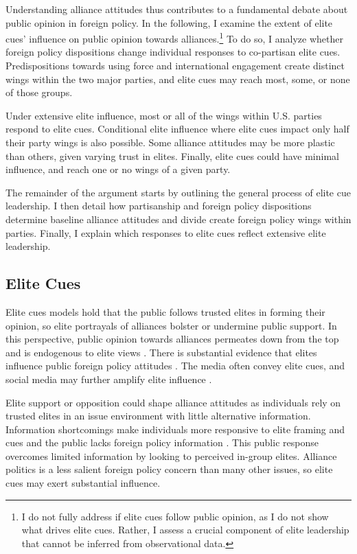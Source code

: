 \documentclass[12pt]{article}
\begin{document}
Understanding alliance attitudes thus contributes to a fundamental debate about public opinion in foreign policy. 
In the following, I examine the extent of elite cues' influence on public opinion towards alliances.\footnote{I do not fully address if elite cues follow public opinion, as I do not show what drives elite cues. Rather, I assess a crucial component of elite leadership that cannot be inferred from observational data.}
To do so, I analyze whether foreign policy dispositions change individual responses to co-partisan elite cues.
Predispositions towards using force and international engagement create distinct wings within the two major parties, and elite cues may reach most, some, or none of those groups.


Under extensive elite influence, most or all of the wings within U.S. parties respond to elite cues. 
Conditional elite influence where elite cues impact only half their party wings is also possible. 
Some alliance attitudes may be more plastic than others, given varying trust in elites. 
Finally, elite cues could have minimal influence, and reach one or no wings of a given party.


The remainder of the argument starts by outlining the general process of elite cue leadership.
I then detail how partisanship and foreign policy dispositions determine baseline alliance attitudes and divide create foreign policy wings within parties.
Finally, I explain which responses to elite cues reflect extensive elite leadership. 


\subsection{Elite Cues} 


Elite cues models hold that the public follows trusted elites in forming their opinion, so elite portrayals of alliances bolster or undermine public support.
In this perspective, public opinion towards alliances permeates down from the top and is endogenous to elite views \citep{Druckman2014}.
There is substantial evidence that elites influence public foreign policy attitudes \citep{BaumPotter2008}. 
The media often convey elite cues, and social media may further amplify elite influence \citep{BaumPotter2019}.   


Elite support or opposition could shape alliance attitudes as individuals rely on trusted elites in an issue environment with little alternative information. 
Information shortcomings make individuals more responsive to elite framing and cues \citep{Druckman2001, Peterson2017} and the public lacks foreign policy information \citep{BaumPotter2008}.
This public response overcomes limited information by looking to perceived in-group elites. 
Alliance politics is a less salient foreign policy concern than many other issues, so elite cues may exert substantial influence.
\end{document}
